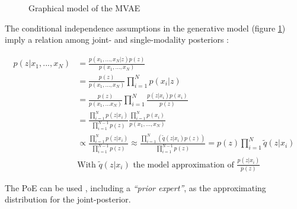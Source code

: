 \documentclass[12pt]{report}
\begin{document}
\begin{figure}
\begin{center}
\caption{Graphical model of the MVAE}
\label{fig:mvae_graph}
\end{center}
\end{figure}


The conditional independence assumptions in the generative model (figure \ref{fig:mvae_graph}) imply a relation among joint- and single-modality posteriors :

\begin{equation}
    \begin{split}
        p(z|x_1, ..., x_N) & = \frac{p(x_1, ..., x_N | z) p(z)}{p(x_1, ..., x_N)} \\
        & = \frac{p(z)}{p(x_1, ..., x_N)} \prod_{i=1}^{N} p(x_i | z) \\
        & = \frac{p(z)}{p(x_1, ... x_N)} \prod_{i=1}^{N} \frac{p(z|x_i)p(x_i)}{p(z)} \\
        & = \frac{\prod_{i=1}^{N} p(z|x_i)}{\prod_{i=1}^{N-1} p(z)} \frac{\prod_{i=1}^{N}p(x_i)}{p(x_1, ..., x_N)} \\
        & \propto \frac{\prod_{i=1}^{N} p(z|x_i)}{\prod_{i=1}^{N-1} p(z)}
        \approx \frac{\prod_{i=1}^{N} (\widetilde{q}(z|x_i)p(z))}{\prod_{i=1}^{N-1} p(z)}
        = p(z) \prod_{i=1}^{N} \widetilde{q}(z | x_i) \\
        & \text{With $\widetilde{q}(z|x_i)$ the model approximation of $\frac{p(z|x_i)}{p(z)}$}
    \label{eq:poe}
    \end{split}
\end{equation}

The PoE can be used , including a \textit{“prior expert”}, as the approximating distribution for the joint-posterior.
\end{document}
